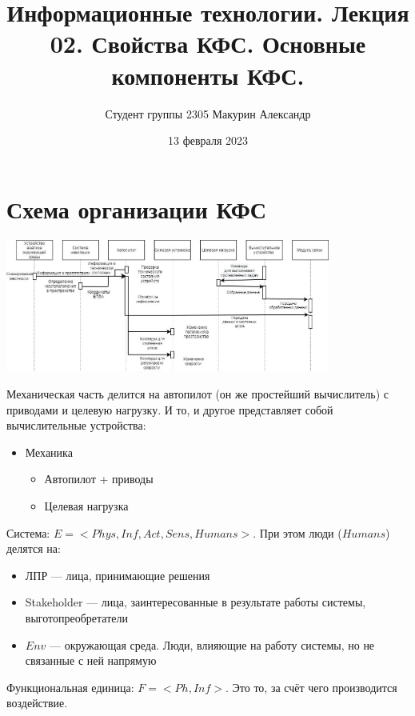 \documentclass{article}
\title{Информационные технологии. Лекция 02. Свойства КФС. Основные компоненты КФС.}
\author{Студент группы 2305 Макурин Александр}
\date{13 февраля 2023}
\begin{document}
\maketitle
\begin{sloppypar}
    \section{Схема организации КФС}
    \includegraphics*[width=0.8\textwidth]{./graphics/Схема организации КФС.jpg}

    Механическая часть делится на автопилот (он же простейший вычислитель) с приводами и целевую нагрузку. И то, и другое представляет собой вычислительные устройства:

    \begin{itemize}
        \item Механика
              \begin{itemize}
                  \item Автопилот + приводы
                  \item Целевая нагрузка
              \end{itemize}
    \end{itemize}

    Система: $E = <Phys, Inf, Act, Sens, Humans>$. При этом люди ($Humans$) делятся на:
    \begin{itemize}
        \item ЛПР — лица, принимающие решения
        \item Stakeholder — лица, заинтересованные в результате работы системы,
              выготопреобретатели
        \item $Env$ — окружающая среда. Люди, влияющие на работу системы, но
              не связанные с ней напрямую
    \end{itemize}


    Функциональная единица: $F=<Ph, Inf>$. Это то, за счёт чего производится воздействие.


\end{sloppypar}
\end{document}
